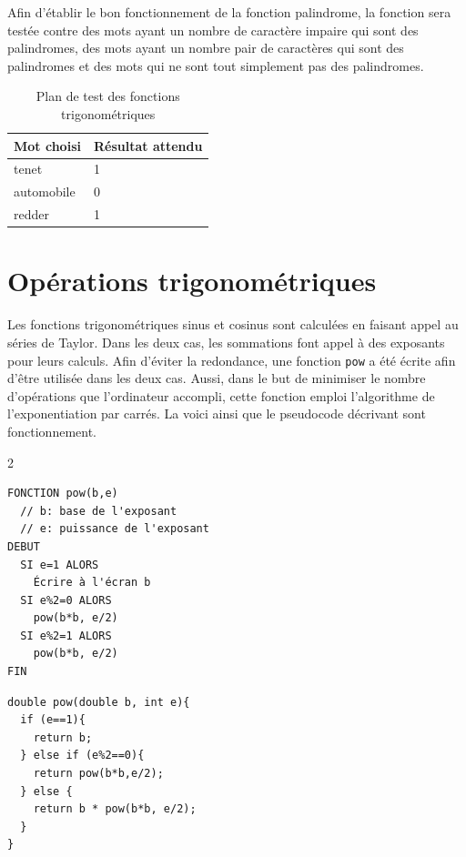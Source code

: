 \documentclass[a11paper, 11pt]{article}
\begin{document}
Afin d'établir le bon fonctionnement de la fonction palindrome, la fonction
sera testée contre des mots ayant un nombre de caractère impaire qui sont des
palindromes, des mots ayant un nombre pair de caractères qui sont des
palindromes et des mots qui ne sont tout simplement pas des palindromes.

\begin{table}[H]
  \centering
  \caption{Plan de test des fonctions trigonométriques}
  \label{tab:pal-tests}
  \begin{tabular}{ll}
    \toprule
    Mot choisi & Résultat attendu \\
    \midrule
    tenet & 1 \\
    automobile & 0 \\
    redder & 1 \\
    \bottomrule
  \end{tabular}
\end{table}


\section{Opérations trigonométriques}

Les fonctions trigonométriques sinus et cosinus sont calculées en faisant appel
au séries de Taylor. Dans les deux cas, les sommations font appel à des
exposants pour leurs calculs. Afin d'éviter la redondance, une fonction
\verb|pow| a été écrite afin d'être utilisée dans les deux cas. Aussi, dans le
but de minimiser le nombre d'opérations que l'ordinateur accompli, cette
fonction emploi l'algorithme de l'exponentiation par carrés\cite{square-exp}.
La voici ainsi que le pseudocode décrivant sont fonctionnement.

\begin{multicols}{2}
\begin{lstlisting}[caption=Pseudocode de la fonction pow]
FONCTION pow(b,e)
  // b: base de l'exposant
  // e: puissance de l'exposant
DEBUT
  SI e=1 ALORS
    Écrire à l'écran b
  SI e%2=0 ALORS
    pow(b*b, e/2)
  SI e%2=1 ALORS
    pow(b*b, e/2)
FIN
\end{lstlisting}
\columnbreak
\begin{lstlisting}[caption=Fonction pow écrite en C]
 double pow(double b, int e){
  if (e==1){
    return b;
  } else if (e%2==0){
    return pow(b*b,e/2);
  } else {
    return b * pow(b*b, e/2);
  }
}
\end{lstlisting}
\end{multicols}
\end{document}
